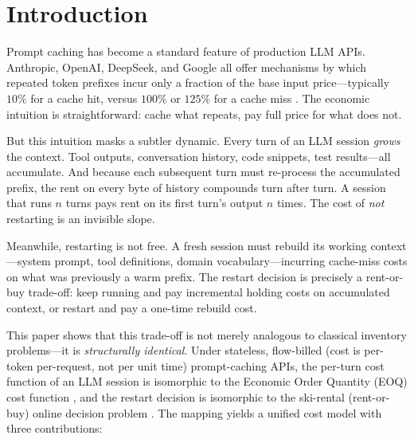 \documentclass[11pt]{article}
\theoremstyle{definition}
\theoremstyle{remark}
\begin{document}
\section{Introduction}

Prompt caching has become a standard feature of production LLM APIs. Anthropic, OpenAI, DeepSeek, and Google all offer mechanisms by which repeated token prefixes incur only a fraction of the base input price---typically $10\%$ for a cache hit, versus $100\%$ or $125\%$ for a cache miss \citep{anthropic2025caching, deepseek2025caching, openai2025caching}. The economic intuition is straightforward: cache what repeats, pay full price for what does not.

But this intuition masks a subtler dynamic. Every turn of an LLM session \emph{grows} the context. Tool outputs, conversation history, code snippets, test results---all accumulate. And because each subsequent turn must re-process the accumulated prefix, the rent on every byte of history compounds turn after turn. A session that runs $n$ turns pays rent on its first turn's output $n$ times. The cost of \emph{not} restarting is an invisible slope.

Meanwhile, restarting is not free. A fresh session must rebuild its working context---system prompt, tool definitions, domain vocabulary---incurring cache-miss costs on what was previously a warm prefix. The restart decision is precisely a rent-or-buy trade-off: keep running and pay incremental holding costs on accumulated context, or restart and pay a one-time rebuild cost.

This paper shows that this trade-off is not merely analogous to classical inventory problems---it is \emph{structurally identical}. Under stateless, flow-billed (cost is per-token per-request, not per unit time) prompt-caching APIs, the per-turn cost function of an LLM session is isomorphic to the Economic Order Quantity (EOQ) cost function \citep{harris1913}, and the restart decision is isomorphic to the ski-rental (rent-or-buy) online decision problem \citep{karlin1994}. The mapping yields a unified cost model with three contributions:
\end{document}
